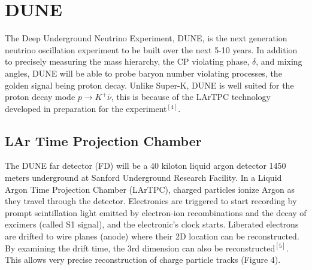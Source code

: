 \documentclass[aps,onecolumn,twoside,secnumarabic,balancelastpage,amsmath,amssymb,nofootinbib,hyperref=pdftex]{revtex4}
\begin{document}
\section {DUNE}
The Deep Underground Neutrino Experiment, DUNE, is the next generation neutrino oscillation experiment to be built over the next 5-10 years. In addition to precisely measuring the mass hierarchy, the CP violating phase, $\delta$, and mixing angles, DUNE will be able to probe baryon number violating processes, the golden signal being proton decay. Unlike Super-K, DUNE is well suited for the proton decay mode $p \rightarrow K^{+}\bar{\nu}$, this is because of the LArTPC technology developed in preparation for the experiment$^{[4]}$.

\subsection{LAr Time Projection Chamber}
The DUNE far detector (FD) will be a 40 kiloton liquid argon detector 1450 meters underground at Sanford Underground Research Facility. In a Liquid Argon Time Projection Chamber (LArTPC), charged particles ionize Argon as they travel through the detector. Electronics are triggered to start recording by prompt scintillation light emitted by electron-ion recombinations and the decay of excimers (called S1 signal), and the electronic's clock starts. Liberated electrons are drifted to wire planes (anode) where their 2D location can be reconstructed. By examining the drift time, the 3rd dimension can also be reconstructed$^{[5]}$. This allows very precise reconstruction of charge particle tracks (Figure 4). 
\end{document}
